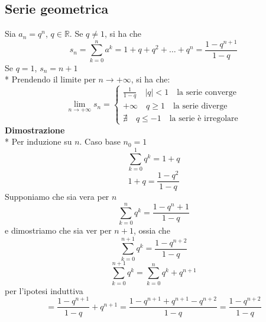\documentclass[12pt]{article}
\begin{document}
\subsection{Serie geometrica}
Sia $a_n = q^n$, $q \in \mathbb{R}$. Se $q \neq 1$, si ha che
\[ s_n =  \sum_{k=0}^n a^k = 1 + q + q^2 + \dots + q^n = \frac{1-q^{n+1}}{1-q}\]
Se $q=1$, $s_n = n+1$\\*
Prendendo il limite per $n \to +\infty$, si ha che:
\[
\lim_{n \to +\infty} s_n = 
\begin{cases}
\frac{1}{1-q} \quad |q| < 1 \quad \text{la serie converge}\\
+\infty \quad q \geq 1 \quad \text{la serie diverge}\\
\nexists \quad q \leq -1 \quad \text{la serie è irregolare}
\end{cases}
\]
\textbf{Dimostrazione}\\*
Per induzione su $n$. Caso base $n_0 = 1$
\[\sum_{k=0}^1 q^k = 1+q\]
\[1+q = \frac{1-q^2}{1-q}\]
Supponiamo che sia vera per $n$
\[ \sum_{k=0}^n q^k = \frac{1-q^n+1}{1-q}\]
e dimostriamo che sia ver per $n+1$, ossia che
\[ \sum_{k=0}^{n+1} q^k = \frac{1-q^{n+2}}{1-q} \]
\[  \sum_{k=0}^{n+1} q^k =  \sum_{k=0}^{n} q^k + q^{n+1}\]
per l'ipotesi induttiva
\[ = \frac{1-q^{n+1}}{1-q}+q^{n+1} = \frac{1-q^{n+1}+q^{n+1}-q^{n+2}}{1-q} = \frac{1-q^{n+2}}{1-q}\]
\end{document}
